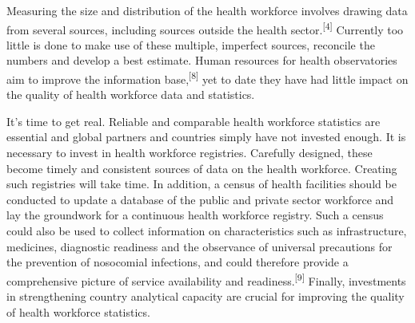 \documentclass{article}
\begin{document}
Measuring the size and distribution of the health workforce involves drawing
data from
several sources, including sources outside the health
sector.\textsuperscript{[}\textsuperscript{4}\textsuperscript{]}
Currently too little is done to make use of these multiple, imperfect sources,
reconcile the numbers and develop a best estimate. Human resources for health
observatories aim to improve the information
base,\textsuperscript{[}\textsuperscript{8}\textsuperscript{]}
yet to date they have had little impact on the quality of health workforce data
and statistics.

It's time to get real. Reliable and comparable health workforce statistics are
essential and global partners and countries simply have not invested enough. It
is
necessary to invest in health workforce registries. Carefully designed, these
become
timely and consistent sources of data on the health workforce. Creating such
registries
will take time. In addition, a census of health facilities should be conducted
to update
a database of the public and private sector workforce and lay the groundwork for
a
continuous health workforce registry. Such a census could also be used to
collect
information on characteristics such as infrastructure, medicines, diagnostic
readiness
and the observance of universal precautions for the prevention of nosocomial
infections,
and could therefore provide a comprehensive picture of service availability and
readiness.\textsuperscript{[}\textsuperscript{9}\textsuperscript{]}
Finally, investments in strengthening country analytical capacity are crucial
for improving the quality of health workforce statistics.
\end{document}
